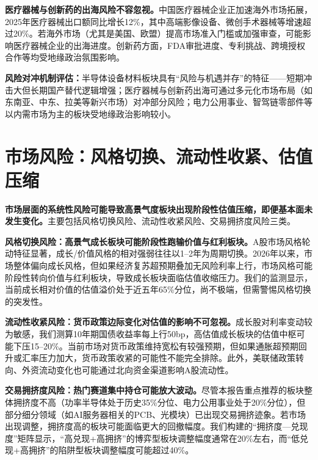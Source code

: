 \textbf{医疗器械与创新药的出海风险不容忽视。}中国医疗器械企业正加速海外市场拓展，2025年医疗器械出口额同比增长12\%，其中高端影像设备、微创手术器械等增速超过20\%。若海外市场（尤其是美国、欧盟）提高市场准入门槛或加强审查，可能影响医疗器械企业的出海进度。创新药方面，FDA审批进度、专利挑战、跨境授权合作等均受地缘政治氛围影响。

\textbf{风险对冲机制评估：}半导体设备材料板块具有“风险与机遇并存”的特征——短期冲击大但长期国产替代逻辑增强；医疗器械与创新药出海可通过多元化市场布局（如东南亚、中东、拉美等新兴市场）对冲部分风险；电力公用事业、智驾链零部件等以内需市场为主的板块受地缘政治影响较小。

\section{市场风险：风格切换、流动性收紧、估值压缩}

\textbf{市场层面的系统性风险可能导致高景气度板块出现阶段性估值压缩，即便基本面未发生变化。}主要包括风格切换风险、流动性收紧风险、交易拥挤度风险三类。

\textbf{风格切换风险：高景气成长板块可能阶段性跑输价值与红利板块。}A股市场风格轮动特征显著，成长/价值风格的相对强弱往往以1--2年为周期切换。2026年以来，市场整体偏向成长风格，但如果经济复苏超预期叠加无风险利率上行，市场风格可能阶段性转向价值与红利板块，导致成长板块面临估值收缩压力。我们的监测显示，当前成长相对价值的估值溢价处于近五年65\%分位，尚不极端，但需警惕风格切换的突发性。

\textbf{流动性收紧风险：货币政策边际变化对估值的影响不可忽视。}成长股对利率变动较为敏感，我们测算10年期国债收益率每上行50bp，高估值成长板块的估值中枢可能下压15--20\%。当前市场对货币政策维持宽松有较强预期，但如果通胀超预期回升或汇率压力加大，货币政策收紧的可能性不能完全排除。此外，美联储政策转向、外资流动变化也可能通过北向资金渠道影响A股流动性。

\textbf{交易拥挤度风险：热门赛道集中持仓可能放大波动。}尽管本报告重点推荐的板块整体拥挤度不高（功率半导体处于历史35\%分位、电力公用事业处于20\%分位），但部分细分领域（如AI服务器相关的PCB、光模块）已出现交易拥挤迹象。若市场出现调整，拥挤度高的板块可能面临更大的回撤幅度。我们构建的“拥挤度—兑现度”矩阵显示，“高兑现+高拥挤”的博弈型板块调整幅度通常在20\%左右，而“低兑现+高拥挤”的陷阱型板块调整幅度可能超过40\%。

